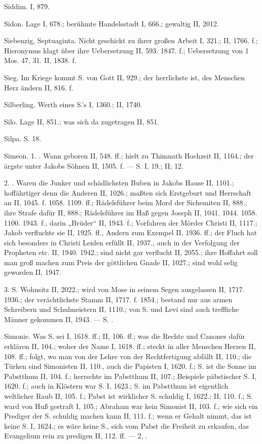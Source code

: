 Siddim. I, 879.

Sidon. Lage I, 678.; berühmte Handelsstadt I, 666.; gewaltig II, 2012.

Siebenzig, Septuaginta. Nicht geschickt zu ihrer großen Arbeit I, 321.; II, 1766. f.; Hieronymus klagt über ihre Uebersetzung II, 593. 1847. f.; Uebersetzung von 1 Mos. 47, 31. II, 1838. f.

Sieg. Im Kriege kommt S. von Gott II, 929.; der herrlichste ist, des Menschen Herz ändern II, 816. f.

Silberling. Werth eines S.’s I, 1360.; II, 1740.

Silo. Lage II, 851.; was sich da zugetragen II, 851.

Silpa. S.  18.

Simeon. 1. . Wann geboren II, 548. ff.; hielt zu Thimnath Hochzeit II, 1164.; der ärgste unter Jakobs Söhnen II, 1505. f. — S.  I, 19.; II;  12.

2. . Waren die Junker und schädlichsten Buben in Jakobs Hause II, 1101.; hoffährtiger denn die Anderen II, 1026.; maßten sich Erstgeburt und Herrschaft an II, 1045. f. 1058. 1109. ff.; Rädelsführer beim Mord der Sichemiten II, 888., ihre Strafe dafür II, 888.; Rädelsführer im Haß gegen Joseph II, 1041. 1044. 1058. 1100. 1943. f., darin „Brüder“ II, 1943. f.; Vorfahren der Mörder Christi II, 1117.; Jakob verfluchte sie II, 1925. ff., Andern zum Exempel II, 1936. ff.; der Fluch hat sich besonders in Christi Leiden erfüllt II, 1937., auch in der Verfolgung der Propheten etc. II, 1940. 1942.; sind nicht gar verflucht II, 2055.; ihre Hoffahrt soll man groß machen zum Preis der göttlichen Gnade II, 1027.; sind wohl selig geworden II, 1947.

3.  S. Wohnsitz II, 2022.; wird von Mose in seinem Segen ausgelassen II, 1717. 1936.; der verächtlichste Stamm II, 1717. f. 1854.; bestand nur aus armen Schreibern und Schulmeistern II, 1110.; von S. und Levi sind auch treffliche Männer gekommen II, 1943. — S. .

Simonie. Was S. sei I, 1618. ff.; II, 106. ff.; was die Rechte und Canones dafür erklären II, 104.; woher der Name I, 1618. ff.; steckt in aller Menschen Herzen II, 108. ff.; folgt, wo man von der Lehre von der Rechtfertigung abfällt II, 110.; die Türken sind Simonisten II, 110., auch die Papisten I, 1620. f.; S. ist die Sonne im Pabstthum II, 104. f.; herrschte im Pabstthum II, 107.; Beispiele päbstischer S. I, 1620. f.; auch in Klöstern war S. I, 1623.; S. im Pabstthum ist eigentlich weltlicher Raub II, 105. f.; Pabst ist wirklicher S. schuldig I, 1622.; II, 110. f.; S. ward von Huß gestraft I, 105.; Abraham war kein Simonist II, 103. f.; wie sich ein Prediger der S. schuldig machen kann II, 111. f.; wenn er Gehalt nimmt, das ist keine S. I, 1624.; es wäre keine S., sich vom Pabst die Freiheit zu erkaufen, das Evangelium rein zu predigen II, 112. ff. —  2, .

